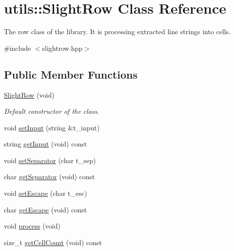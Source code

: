 \hypertarget{classutils_1_1SlightRow}{}\section{utils\+:\+:Slight\+Row Class Reference}
\label{classutils_1_1SlightRow}


The row class of the library. It is processing extracted line strings into cells.  




{\ttfamily \#include $<$slightrow.\+hpp$>$}

\subsection*{Public Member Functions}
\begin{DoxyCompactItemize}
\item 
\mbox{\label{classutils_1_1SlightRow_aaf6939d3dbb75448193beef4cc4f1300}} 
\hyperlink{classutils_1_1SlightRow_aaf6939d3dbb75448193beef4cc4f1300}{Slight\+Row} (void)
\begin{DoxyCompactList}\small\item\em Default constructor of the class. \end{DoxyCompactList}\item 
void \hyperlink{classutils_1_1SlightRow_abb27b43d2dbe46d47805c05f7b87ab82}{set\+Input} (string \&t\+\_\+input)
\item 
string \hyperlink{classutils_1_1SlightRow_a8491ac21fba9e5c258e7c1a3bf3da26a}{get\+Input} (void) const
\item 
void \hyperlink{classutils_1_1SlightRow_ad26f06a994890c68fedb45ba1e95f25d}{set\+Separator} (char t\+\_\+sep)
\item 
char \hyperlink{classutils_1_1SlightRow_a1095fd58142659bd85871622ab3d9b1c}{get\+Separator} (void) const
\item 
void \hyperlink{classutils_1_1SlightRow_abdee6f0ba2d0e6ce32cc8e21020f2218}{set\+Escape} (char t\+\_\+esc)
\item 
char \hyperlink{classutils_1_1SlightRow_a75266f8f076b39135677cf54dcff986c}{get\+Escape} (void) const
\item 
void \hyperlink{classutils_1_1SlightRow_a9774969c2a0276491ab368216c2592a0}{process} (void)
\item 
size\+\_\+t \hyperlink{classutils_1_1SlightRow_af7df52464ce8151d7c3c429d0a796c7f}{get\+Cell\+Count} (void) const

\end{DoxyCompactItemize}
